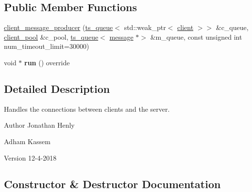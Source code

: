 \subsection*{Public Member Functions}
\begin{DoxyCompactItemize}
\item 
\hyperlink{classbattleship_1_1game__server_1_1client__message__producer_a5f2a0bfac369d551954a77c58c2abad2}{client\+\_\+message\+\_\+producer} (\hyperlink{classbattleship_1_1ts__queue}{ts\+\_\+queue}$<$ std\+::weak\+\_\+ptr$<$ \hyperlink{classbattleship_1_1game__server_1_1client}{client} $>$$>$ \&c\+\_\+queue, \hyperlink{classbattleship_1_1game__server_1_1client__pool}{client\+\_\+pool} \&c\+\_\+pool, \hyperlink{classbattleship_1_1ts__queue}{ts\+\_\+queue}$<$ \hyperlink{classbattleship_1_1network__message_1_1message}{message} $\ast$$>$ \&m\+\_\+queue, const unsigned int num\+\_\+timeout\+\_\+limit=30000)
\item 
\mbox{\label{classbattleship_1_1game__server_1_1client__message__producer_af3f501bb1e23993e7958d990e44219ed}} 
void $\ast$ {\bfseries run} () override
\end{DoxyCompactItemize}


\subsection{Detailed Description}
Handles the connections between clients and the server. 

\begin{DoxyAuthor}{Author}
Jonathan Henly 

Adham Kassem 
\end{DoxyAuthor}
\begin{DoxyVersion}{Version}
12-\/4-\/2018 
\end{DoxyVersion}


\subsection{Constructor \& Destructor Documentation}
\mbox{\label{classbattleship_1_1game__server_1_1client__message__producer_a5f2a0bfac369d551954a77c58c2abad2}} 
